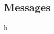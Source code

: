 \documentclass[internal]{nhitec_design}
\begin{document}
\subsection{Messages}\label{sec:messages}









































\newpage
h
\newpage
\end{document}
